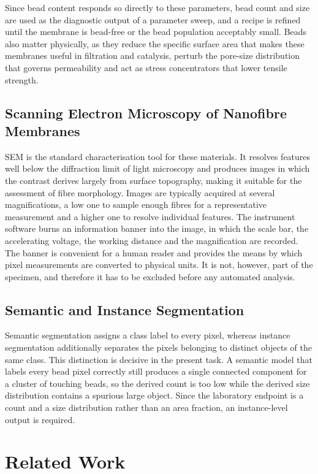Since bead content responds so directly to these parameters, bead count and size
are used as the diagnostic output of a parameter sweep, and a recipe is refined
until the membrane is bead-free or the bead population acceptably small. Beads also
matter physically, as they reduce the specific surface area that makes these membranes
useful in filtration and catalysis, perturb the pore-size distribution that
governs permeability and act as stress concentrators that lower tensile strength.

\subsection{Scanning Electron Microscopy of Nanofibre Membranes}

SEM is the standard characterisation tool for these materials. It resolves features
well below the diffraction limit of light microscopy and produces images in which
the contrast derives largely from surface topography, making it suitable for the
assessment of fibre morphology. Images are typically acquired at several
magnifications, a low one to sample enough fibres for a representative
measurement and a higher one to resolve individual features. The
instrument software burns an information banner into the image, in which the scale
bar, the accelerating voltage, the working distance and the magnification are
recorded. The banner is convenient for a human reader and provides the means by
which pixel measurements are converted to physical units. It is not, however, part
of the specimen, and therefore it has to be excluded before any automated analysis.

\subsection{Semantic and Instance Segmentation}

Semantic segmentation assigns a class label to every pixel, whereas instance
segmentation additionally separates the pixels belonging to distinct objects of the
same class. This distinction is decisive in the present task. A semantic model that
labels every bead pixel correctly still produces a single connected component for a
cluster of touching beads, so the derived count is too low while the derived
size distribution contains a spurious large object. Since the laboratory endpoint
is a count and a size distribution rather than an area fraction, an instance-level
output is required.

\section{Related Work}

